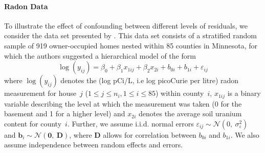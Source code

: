 \documentclass[11pt]{article} %
\begin{document}
\paragraph{Radon Data}\label{sec:ex}
To illustrate the effect of confounding between different levels of residuals, we consider the data set presented by
 \cite{Gelman:2006ue}. This data set consists of a stratified random sample of 919 owner-occupied homes nested within 85 counties in Minnesota, for which the authors suggested a hierarchical model of the form
%
\begin{equation}\label{eq:radon}
  \log(y_{ij}) = \beta_0 + \beta_1 x_{1ij} + \beta_2 x_{2i} + b_{0i} + b_{1i} + \varepsilon_{ij}
\end{equation}
%
where   $\log(y_{ij})$ denotes the (log pCi/L, i.e log picoCurie per litre) radon measurement for house~$j$ ($1 \le j \le n_i, 1 \le i \le 85$) within county~$i$,
 $x_{1ij}$ is a binary variable describing the level at which the measurement was taken (0 for the basement and 1 for a higher level) and $x_{2i}$ denotes the average soil uranium content for  county~$i$. 
 Further, we assume i.i.d. normal errors $\varepsilon_{ij} \sim \mathcal{N} (0,\ \sigma^2_{\varepsilon})$  and $\bm{b}_i \sim \mathcal{N}(\bm{0},\ \bm{D})$, where $\bm{D}$ allows for correlation between $b_{0i}$ and $b_{1i}$.
We also assume independence between random effects and errors. 
\end{document}
